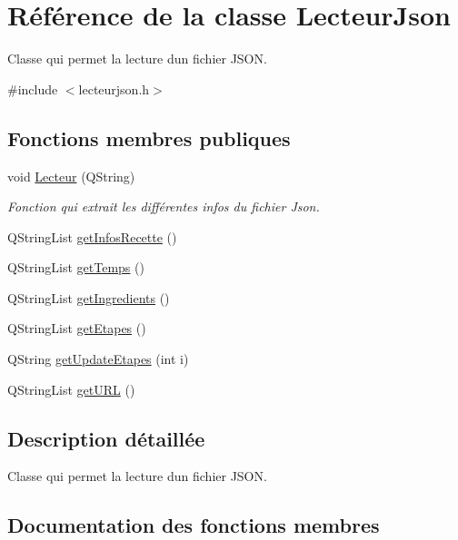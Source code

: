 \hypertarget{class_lecteur_json}{}\section{Référence de la classe Lecteur\+Json}
\label{class_lecteur_json}


Classe qui permet la lecture d\textquotesingle{}un fichier J\+S\+ON.  




{\ttfamily \#include $<$lecteurjson.\+h$>$}

\subsection*{Fonctions membres publiques}
\begin{DoxyCompactItemize}
\item 
void \hyperlink{class_lecteur_json_a6b74dbecd8cb87168fb2d36bc1a22f2b}{Lecteur} (Q\+String)
\begin{DoxyCompactList}\small\item\em Fonction qui extrait les différentes infos du fichier Json. \end{DoxyCompactList}\item 
Q\+String\+List \hyperlink{class_lecteur_json_a0c507870050e16de3688d310d1f3b65a}{get\+Infos\+Recette} ()
\item 
Q\+String\+List \hyperlink{class_lecteur_json_a88d73523c1775a8c7001b5abae152740}{get\+Temps} ()
\item 
Q\+String\+List \hyperlink{class_lecteur_json_a0c18d502de54aea85b4d76f1b2858423}{get\+Ingredients} ()
\item 
Q\+String\+List \hyperlink{class_lecteur_json_ab698142bf586bb224c35962525ce3915}{get\+Etapes} ()
\item 
Q\+String \hyperlink{class_lecteur_json_ad3a86b8dc577d1e6d77a66b8ece8442a}{get\+Update\+Etapes} (int i)
\item 
Q\+String\+List \hyperlink{class_lecteur_json_a4ceacda970b2b838bb41211decdd799f}{get\+U\+RL} ()
\end{DoxyCompactItemize}


\subsection{Description détaillée}
Classe qui permet la lecture d\textquotesingle{}un fichier J\+S\+ON. 

\subsection{Documentation des fonctions membres}
\mbox{\label{class_lecteur_json_ab698142bf586bb224c35962525ce3915}} 

